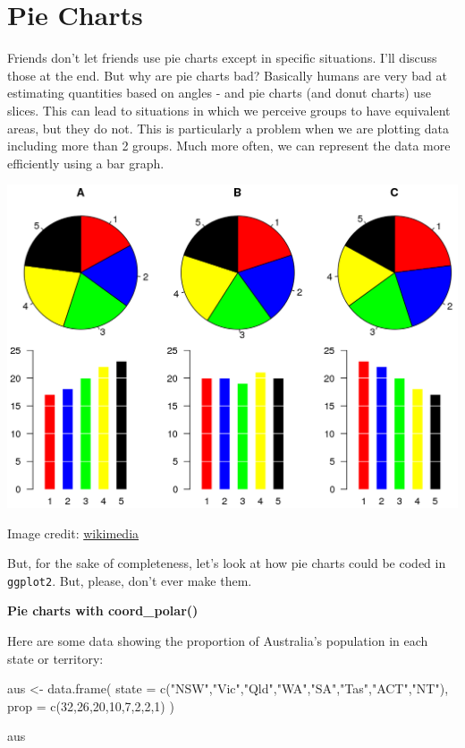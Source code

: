 \documentclass[
  letterpaper,
  DIV=11,
  numbers=noendperiod]{scrreprt}
\newenvironment{Shaded}{\begin{snugshade}}{\end{snugshade}}
\newcommand{\AttributeTok}[1]{\textcolor[rgb]{0.40,0.45,0.13}{#1}}
\newcommand{\DecValTok}[1]{\textcolor[rgb]{0.68,0.00,0.00}{#1}}
\newcommand{\FunctionTok}[1]{\textcolor[rgb]{0.28,0.35,0.67}{#1}}
\newcommand{\NormalTok}[1]{\textcolor[rgb]{0.00,0.23,0.31}{#1}}
\newcommand{\OtherTok}[1]{\textcolor[rgb]{0.00,0.23,0.31}{#1}}
\newcommand{\StringTok}[1]{\textcolor[rgb]{0.13,0.47,0.30}{#1}}
\begin{document}

\hypertarget{pie-charts}{%
\chapter{Pie Charts}\label{pie-charts}}

Friends don't let friends use pie charts except in specific situations.
I'll discuss those at the end. But why are pie charts bad? Basically
humans are very bad at estimating quantities based on angles - and pie
charts (and donut charts) use slices. This can lead to situations in
which we perceive groups to have equivalent areas, but they do not. This
is particularly a problem when we are plotting data including more than
2 groups. Much more often, we can represent the data more efficiently
using a bar graph.

\includegraphics{./img/pie.png}

Image credit:
\href{https://commons.wikimedia.org/wiki/File:Piecharts.svg}{wikimedia}

But, for the sake of completeness, let's look at how pie charts could be
coded in \texttt{ggplot2}. But, please, don't ever make them.

\textbf{Pie charts with coord\_polar()}

Here are some data showing the proportion of Australia's population in
each state or territory:

\begin{Shaded}
\begin{Highlighting}[]
\NormalTok{aus }\OtherTok{\textless{}{-}} \FunctionTok{data.frame}\NormalTok{(}
  \AttributeTok{state =} \FunctionTok{c}\NormalTok{(}\StringTok{"NSW"}\NormalTok{,}\StringTok{"Vic"}\NormalTok{,}\StringTok{"Qld"}\NormalTok{,}\StringTok{"WA"}\NormalTok{,}\StringTok{"SA"}\NormalTok{,}\StringTok{"Tas"}\NormalTok{,}\StringTok{"ACT"}\NormalTok{,}\StringTok{"NT"}\NormalTok{),}
  \AttributeTok{prop =} \FunctionTok{c}\NormalTok{(}\DecValTok{32}\NormalTok{,}\DecValTok{26}\NormalTok{,}\DecValTok{20}\NormalTok{,}\DecValTok{10}\NormalTok{,}\DecValTok{7}\NormalTok{,}\DecValTok{2}\NormalTok{,}\DecValTok{2}\NormalTok{,}\DecValTok{1}\NormalTok{)}
\NormalTok{)}

\NormalTok{aus}
\end{Highlighting}
\end{Shaded}
\end{document}
